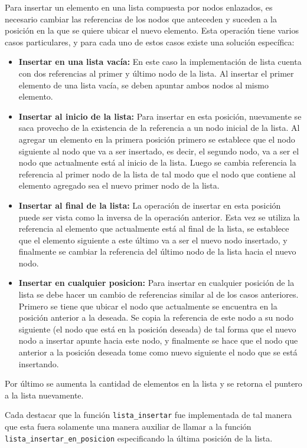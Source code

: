 \documentclass[titlepage,a4paper]{article}
\begin{document}
Para insertar un elemento en una lista compuesta por nodos enlazados, es necesario cambiar las referencias de los nodos que anteceden y suceden a la posición en la que se quiere ubicar el nuevo elemento. Esta operación tiene varios casos particulares, y para cada uno de estos casos existe una solución específica:

\begin{itemize}
  \item \textbf{Insertar en una lista vacía:} En este caso la implementación de lista cuenta con dos referencias al primer y último nodo de la lista. Al insertar el primer elemento de una lista vacía, se deben apuntar ambos nodos al mismo elemento.
  \item \textbf{Insertar al inicio de la lista:} Para insertar en esta posición, nuevamente se saca provecho de la existencia de la referencia a un nodo inicial de la lista. Al agregar un elemento en la primera posición primero se establece que el nodo siguiente al nodo que va a ser insertado, es decir, el segundo nodo, va a ser el nodo que actualmente está al inicio de la lista. Luego se cambia referencia la referencia al primer nodo de la lista de tal modo que el nodo que contiene al elemento agregado sea el nuevo primer nodo de la lista. 
  \item \textbf{Insertar al final de la lista:} La operación de insertar en esta posición puede ser vista como la inversa de la operación anterior. Esta vez se utiliza la referencia al elemento que actualmente está al final de la lista, se establece que el elemento siguiente a este último va a ser el nuevo nodo insertado, y finalmente se cambiar la referencia del último nodo de la lista hacia el nuevo nodo.
  \item \textbf{Insertar en cualquier posicion:} Para insertar en cualquier posición de la lista se debe hacer un cambio de referencias similar al de los casos anteriores. Primero se tiene que ubicar el nodo que actualmente se encuentra en la posición anterior a la deseada. Se copia la referencia de este nodo a su nodo siguiente (el nodo que está en la posición deseada) de tal forma que el nuevo nodo a insertar apunte hacia este nodo, y finalmente se hace que el nodo que anterior a la posición deseada tome como nuevo siguiente el nodo que se está insertando.
\end{itemize}

Por último se aumenta la cantidad de elementos en la lista y se retorna el puntero a la lista nuevamente.

Cada destacar que la función \lstinline{lista_insertar} fue implementada de tal manera que esta fuera solamente una manera auxiliar de llamar a la función \lstinline{lista_insertar_en_posicion} especificando la última posición de la lista.
\end{document}
